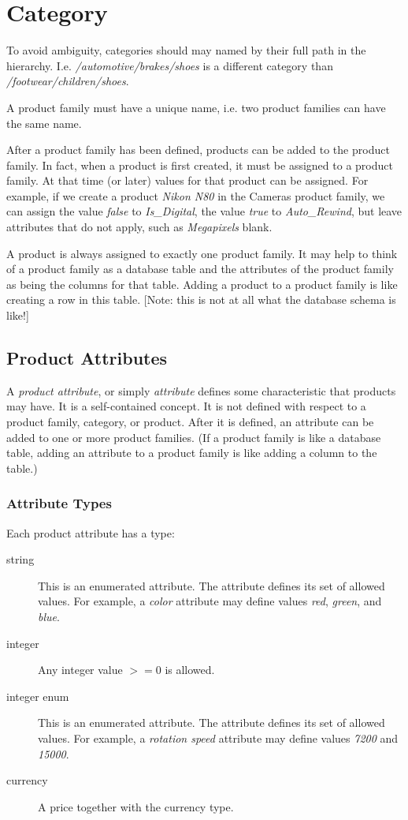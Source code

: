 \documentclass[letterpaper, 12pt]{article}
\begin{document}
\section{Category}
 To avoid ambiguity, categories should may named by their full path in the hierarchy. I.e. \textit{/automotive/brakes/shoes} is a different category than \textit{/footwear/children/shoes}.



A product family must have a unique name, i.e. two product families can have the same name.

After a product family has been defined, products can be added to the product family.  In fact, when a product is first created, it must be assigned to a product family.  At that time (or later) values for that product can be assigned.  For example, if we create a product {\em Nikon N80} in the Cameras product family, we can assign the value \textit{false} to \textit{Is\_Digital}, the value \textit{true} to \textit{Auto\_Rewind},
but leave attributes that do not apply, such as \textit{Megapixels} blank.

A product is always assigned to exactly one product family.  It may help to think of a product family as a database table and the attributes of the product family as being the columns for that table.  Adding a product to a product family is like creating a row in this table.  [Note: this is not at all what the database schema is like!]

\subsection{Product Attributes}
A \textit{product attribute}, or simply \textit{attribute} defines some characteristic that products may have.   It is a self-contained concept.  It is not defined with respect to a product family, category, or product.  After it is defined, an attribute can be added to one or more product families.  (If a product family is like a database table, adding an attribute to a product family is like adding a column to the table.)

\subsubsection{Attribute Types}
Each product attribute has a type:
\begin{description}
\item[string] This is an enumerated  attribute.  The attribute defines its set of allowed values.  For example, a \textit{color} attribute may define values \textit{red}, \textit{green}, and \textit{blue}.
\item[integer] Any integer value $>= 0$ is allowed.
\item[integer enum] This is an enumerated attribute.  The attribute defines its set of allowed values.  For example, a \textit{rotation speed} attribute may define values \textit{7200} and \textit{15000}.
\item[currency] A price together with the currency type.
\end{description}
\end{document}

